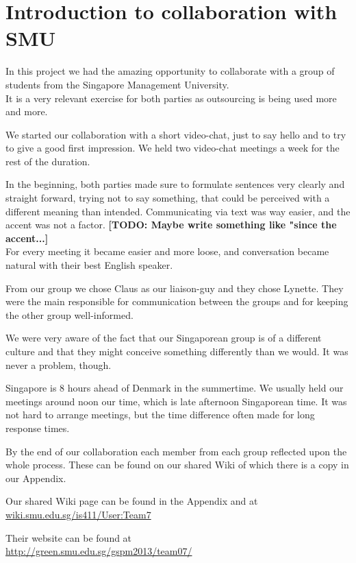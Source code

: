 \section{Introduction to collaboration with SMU}
In this project we had the amazing opportunity to collaborate with a group of students from the Singapore Management University.
\\It is a very relevant exercise for both parties as outsourcing is being used more and more.

We started our collaboration with a short video-chat, just to say hello and to try to give a good first impression. We held two video-chat meetings a week for the rest of the duration.

In the beginning, both parties made sure to formulate sentences very clearly and straight forward, trying not to say something, that could be perceived with a different meaning than intended. Communicating via text was way easier, and the accent was not a factor. \textbf{[TODO: Maybe write something like "since the accent...]}
\\For every meeting it became easier and more loose, and conversation became natural with their best English speaker.

From our group we chose Claus as our liaison-guy and they chose Lynette. They were the main responsible for communication between the groups and for keeping the other group well-informed.

We were very aware of the fact that our Singaporean group is of a different culture and that they might conceive something differently than we would. It was never a problem, though.

Singapore is 8 hours ahead of Denmark in the summertime. We usually held our meetings around noon our time, which is late afternoon Singaporean time. It was not hard to arrange meetings, but the time difference often made for long response times.

By the end of our collaboration each member from each group reflected upon the whole process. These can be found on our shared Wiki of which there is a copy in our Appendix.

Our shared Wiki page can be found in the Appendix and at
\\\url{wiki.smu.edu.sg/is411/User:Team7}

Their website can be found at
\\\url{http://green.smu.edu.sg/gspm2013/team07/}
\newpage